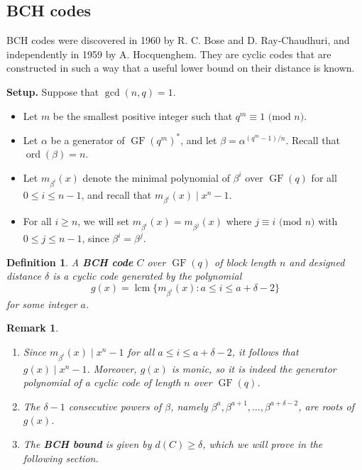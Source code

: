 \documentclass[10pt]{article}
\DeclareMathOperator{\ord}{ord}
\DeclareMathOperator{\GF}{GF}
\DeclareMathOperator{\lcm}{lcm}
\theoremstyle{newstyle}
\newtheorem{remark}[thm]{Remark}
\newtheorem{defn}[thm]{Definition}
\begin{document}
\subsection{BCH codes}

BCH codes were discovered in 1960 by R. C. Bose and D. Ray-Chaudhuri, and independently in 
1959 by A. Hocquenghem. They are cyclic codes that are constructed in such a way that 
a useful lower bound on their distance is known. 

{\bf Setup.} Suppose that $\gcd(n, q) = 1$.
\begin{itemize}
    \item Let $m$ be the smallest positive integer such that $q^m \equiv 1 \text{ (mod $n$)}$. 
    \item Let $\alpha$ be a generator of $\GF(q^m)^*$, and let $\beta = \alpha^{(q^m-1)/n}$. 
    Recall that $\ord(\beta) = n$. 
    \item Let $m_{\beta^i}(x)$ denote the minimal polynomial of $\beta^i$ over $\GF(q)$ for all 
    $0 \leq i \leq n-1$, and recall that $m_{\beta^i}(x) \mid x^n - 1$. 
    \item For all $i \geq n$, we will set $m_{\beta^i}(x) = m_{\beta^j}(x)$ where 
    $j \equiv i \text{ (mod $n$)}$ with $0 \leq j \leq n-1$, 
    since $\beta^i = \beta^j$. 
\end{itemize}

\begin{defn}
A {\bf BCH code} $C$ over $\GF(q)$ of block length $n$ and designed distance $\delta$ is a cyclic 
code generated by the polynomial 
\[ g(x) = \lcm\{m_{\beta^i}(x) : a \leq i \leq a + \delta - 2\} \]
for some integer $a$. 
\end{defn}

\begin{remark}~
\begin{enumerate}[(1)]
    \item Since $m_{\beta^i}(x) \mid x^n-1$ for all $a \leq i \leq a+\delta-2$, it follows that 
    $g(x) \mid x^n-1$. Moreover, $g(x)$ is monic, so it is indeed the generator polynomial 
    of a cyclic code of length $n$ over $\GF(q)$. 
    \item The $\delta - 1$ consecutive powers of $\beta$, namely 
    $\beta^a, \beta^{a+1}, \dots, \beta^{a+\delta-2}$, are roots of $g(x)$. 
    \item The {\bf BCH bound} is given by $d(C) \geq \delta$, which we will prove in the following section.
\end{enumerate}
\end{remark}
\end{document}
